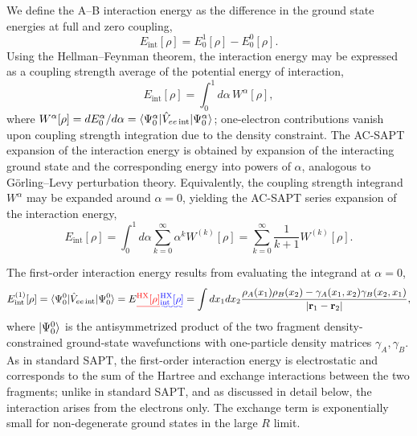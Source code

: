 \documentclass[journal=jctcce,manuscript=article]{achemso}
\providecommand{\DIFadd}[1]{{\protect\color{blue}\uwave{#1}}} %
\providecommand{\DIFdel}[1]{{\protect\color{red}\sout{#1}}}                      %
\providecommand{\DIFaddbegin}{} %
\providecommand{\DIFaddend}{} %
\providecommand{\DIFdelbegin}{} %
\providecommand{\DIFdelend}{} %
\newcommand{\DIFscaledelfig}{0.5}
\newlength{\DIFdelgraphicswidth} %
\newlength{\DIFdelgraphicsheight} %
\newcommand{\DIFaddincludegraphics}[2][]{{\color{blue}\fbox{\DIFOincludegraphics[#1]{#2}}}} %
\newcommand{\DIFdelincludegraphics}[2][]{%
\sbox{\DIFdelgraphicsbox}{\DIFOincludegraphics[#1]{#2}}%
\settoboxwidth{\DIFdelgraphicswidth}{\DIFdelgraphicsbox} %
\settoboxtotalheight{\DIFdelgraphicsheight}{\DIFdelgraphicsbox} %
\scalebox{\DIFscaledelfig}{%
\parbox[b]{\DIFdelgraphicswidth}{\usebox{\DIFdelgraphicsbox}\\[-\baselineskip] \rule{\DIFdelgraphicswidth}{0em}}\llap{\resizebox{\DIFdelgraphicswidth}{\DIFdelgraphicsheight}{%
\setlength{\unitlength}{\DIFdelgraphicswidth}%
\begin{picture}(1,1)%
\thicklines\linethickness{2pt} %
{\color[rgb]{1,0,0}\put(0,0){\framebox(1,1){}}}%
{\color[rgb]{1,0,0}\put(0,0){\line( 1,1){1}}}%
{\color[rgb]{1,0,0}\put(0,1){\line(1,-1){1}}}%
\end{picture}%
}\hspace*{3pt}}} %
} %
\DeclareRobustCommand{\DIFaddbegin}{\DIFOaddbegin \let\includegraphics\DIFaddincludegraphics} %
\DeclareRobustCommand{\DIFaddend}{\DIFOaddend \let\includegraphics\DIFOincludegraphics} %
\DeclareRobustCommand{\DIFdelbegin}{\DIFOdelbegin \let\includegraphics\DIFdelincludegraphics} %
\DeclareRobustCommand{\DIFdelend}{\DIFOaddend \let\includegraphics\DIFOincludegraphics} %
\begin{document}
We define the A--B interaction energy as the difference in the ground
state energies at full and zero coupling,
\begin{equation}
  E_{\text{int}}[\rho] =
  E^1_0[\rho] - E^0_0[\rho].
\end{equation}
Using the Hellman--Feynman theorem, the interaction energy may be
expressed as a coupling strength 
average of the potential energy of interaction\cite{PhysRevA.82.024501},
\begin{equation}
  E_{\text{int}}[\rho] = \int_0^1 d\alpha\, W^\alpha[\rho],
\end{equation}
where $W^\alpha[\rho] = dE_0^{\alpha}/d\alpha = \braket{ \Psi^\alpha_0 |
    \hat{V}_{ee \,\text{int}} | \Psi^\alpha_0 }$;
one-electron contributions vanish upon coupling strength integration due
to the density constraint. The AC-SAPT expansion of the interaction
energy is obtained by expansion of the interacting ground state
and the corresponding energy into powers of $\alpha$, analogous to
G{\"o}rling--Levy perturbation theory.\cite{PhysRevB.47.13105,PhysRevA.52.4493}
Equivalently, the coupling strength integrand $W^\alpha$ may be expanded around
$\alpha=0$, yielding the AC-SAPT series expansion of the interaction
energy, 
\begin{equation}
  \label{eq:acsapt}
  E_{\text{int}}[\rho] = \int_0^1 d\alpha \sum_{k = 0}^{\infty} \alpha^k
  W^{(k)}[\rho] = \sum_{k=0}^{\infty} \frac{1}{k+1} W^{(k)}[\rho].
\end{equation}

The first-order interaction energy results from evaluating the integrand
at $\alpha=0$, 
\begin{equation}
  E_{\text{int}}^{(1)}[\rho] = \braket{ \Psi^0_0 |
    \hat{V}_{ee \,\text{int}} | \Psi^0_0 } = E\DIFdelbegin \DIFdel{^{\text{HX}}[\rho] }\DIFdelend \DIFaddbegin \DIFadd{^{\text{HX}}_{\text{int}}[\rho] }\DIFaddend = 
  \int dx_1 dx_2 \frac{ \rho_A(x_1)
    \rho_B(x_2) - \gamma_A(x_1,x_2)\gamma_B(x_2,x_1) }{|\mathbf{r}_1-\mathbf{r}_2|},
\end{equation}
where $\ket{\Psi^0_0}$ is the antisymmetrized
product of the two fragment density-constrained ground-state
wavefunctions with one-particle 
density matrices $\gamma_A, \gamma_B$. As in standard SAPT, the
first-order interaction 
energy is electrostatic and corresponds to the sum of the Hartree
and exchange \DIFaddbegin \DIFadd{(HX) }\DIFaddend interactions between the two fragments; unlike in standard
SAPT, and as discussed in detail below, the interaction arises from the
electrons only. The exchange term 
is exponentially small for non-degenerate ground states in the large $R$
limit. 
\end{document}
